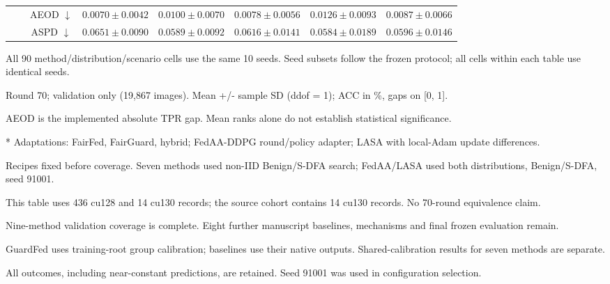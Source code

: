 \begin{table}[t]
{\begin{tabular}{l|l|c|ccccc}
 &  & AEOD $\downarrow$ & $0.0070 \pm 0.0042$ & $0.0100 \pm 0.0070$ & $0.0078 \pm 0.0056$ & $0.0126 \pm 0.0093$ & $0.0087 \pm 0.0066$ \\
 &  & ASPD $\downarrow$ & $0.0651 \pm 0.0090$ & $0.0589 \pm 0.0092$ & $0.0616 \pm 0.0141$ & $0.0584 \pm 0.0189$ & $0.0596 \pm 0.0146$ \\
\hline\hline
\end{tabular}}
\par\smallskip
\begin{minipage}{\textwidth}\scriptsize
All 90 method/distribution/scenario cells use the same 10 seeds. Seed subsets follow the frozen protocol; all cells within each table use identical seeds.\par
Round 70; validation only (19,867 images). Mean +/- sample SD (ddof = 1); ACC in \%, gaps on [0, 1].\par
AEOD is the implemented absolute TPR gap. Mean ranks alone do not establish statistical significance.\par
* Adaptations: FairFed, FairGuard, hybrid; FedAA-DDPG round/policy adapter; LASA with local-Adam update differences.\par
Recipes fixed before coverage. Seven methods used non-IID Benign/S-DFA search; FedAA/LASA used both distributions, Benign/S-DFA, seed 91001.\par
This table uses 436 cu128 and 14 cu130 records; the source cohort contains 14 cu130 records. No 70-round equivalence claim.\par
Nine-method validation coverage is complete. Eight further manuscript baselines, mechanisms and final frozen evaluation remain.\par
GuardFed uses training-root group calibration; baselines use their native outputs. Shared-calibration results for seven methods are separate.\par
All outcomes, including near-constant predictions, are retained. Seed 91001 was used in configuration selection.\par
\end{minipage}
\end{table}

